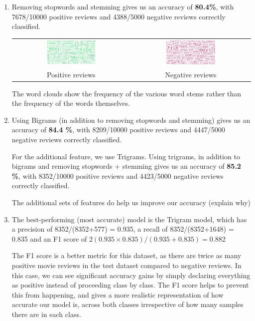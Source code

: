 \documentclass[12pt]{article}
\begin{document}
\begin{enumerate}[label=(\alph*)]
    \item Removing stopwords and stemming gives us an accuracy of \textbf{80.4\%}, with 7678/10000 positive reviews and 4388/5000 negative reviews correctly classified.

    \begin{center}
        \begin{tabular}{c c}
            \includegraphics[width=0.44\textwidth]{../Q1/Qd/wc_pos.png} & \includegraphics[width=0.44\textwidth]{../Q1/Qd/wc_neg.png} \\
            Positive reviews & Negative reviews
        \end{tabular}
    \end{center}

    The word clouds show the frequency of the various word stems rather than the frequency of the words themselves.

\item Using Bigrams (in addition to removing stopwords and stemming) gives us an accuracy of \textbf{84.4 \%}, with 8209/10000 positive reviews and 4447/5000 negative reviews correctly classified.

    For the additional feature, we use Trigrams. Using trigrams, in addition to bigrams and removing stopwords + stemming gives us an accuracy of \textbf{85.2 \%}, with 8352/10000 positive reviews and 4423/5000 negative reviews correctly classified.

    The additional sets of features do help us improve our accuracy (explain why)

\item The best-performing (most accurate) model is the Trigram model, which has a precision of 8352/(8352+577) = 0.935, a recall of 8352/(8352+1648) = 0.835 and an F1 score of $2(0.935 \times 0.835)/(0.935+0.835) = 0.882$

    The F1 score is a better metric for this dataset, as there are twice as many positive movie reviews in the test dataset compared to negative reviews. In this case, we can see significant accuracy gains by simply declaring everything as positive instead of proceeding class by class. The F1 score helps to prevent this from happening, and gives a more realistic representation of how accurate our model is, across both classes irrespective of how many samples there are in each class.

\end{enumerate}
\end{document}
